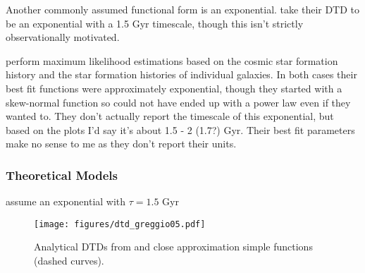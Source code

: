 \documentclass[twocolumn]{aastex631}
\begin{document}
Another commonly assumed functional form is an exponential. \citet{Schonrich2009-RadialMixing} take their DTD to be an exponential with a 1.5 Gyr timescale, though this isn't strictly observationally motivated.

\citet{Stolger2020-ExponentialDTD} perform maximum likelihood estimations based on the cosmic star formation history and the star formation histories of individual galaxies. In both cases their best fit functions were approximately exponential, though they started with a skew-normal function so could not have ended up with a power law even if they wanted to. They don't actually report the timescale of this exponential, but based on the plots I'd say it's about 1.5 - 2 (1.7?) Gyr. Their best fit parameters make no sense to me as they don't report their units.


\subsubsection{Theoretical Models}

\citet{Matteucci1986-SupernovaEnrichment}

\citet{Greggio2005-AnalyticalRates}

\citet{Rajamuthukumar2022-TripleEvolution}

\citet{Schonrich2009-RadialMixing,Weinberg2017-ChemicalEquilibrium} assume an exponential with $\tau=1.5$ Gyr

\begin{figure}
    \centering
    \texttt{[image: figures/dtd\_greggio05.pdf]}
    \caption{Analytical DTDs from \citet[][solid curves]{Greggio2005-AnalyticalRates} and close approximation simple functions (dashed curves).}
    \label{fig:dtd-greggio05}
\end{figure}
\end{document}
